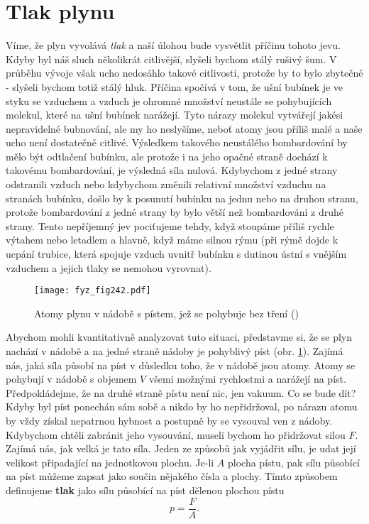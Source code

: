   \section{Tlak plynu}\label{fyz:IchapIXLsecII}
    Víme, že plyn vyvolává \emph{tlak} a naší úlohou bude vysvětlit příčinu tohoto jevu. Kdyby byl
    náš sluch několikrát citlivější, slyšeli bychom stálý rušivý šum. V průběhu vývoje však ucho
    nedosáhlo takové citlivosti, protože by to bylo zbytečné - slyšeli bychom totiž stálý hluk.
    Příčina spočívá v tom, že ušní bubínek je ve styku se vzduchem a vzduch je ohromné množství
    neustále se pohybujících molekul, které na ušní bubínek narážejí. Tyto nárazy molekul vytvářejí
    jakési nepravidelné bubnování, ale my ho neslyšíme, neboť atomy jsou příliš malé a naše ucho
    není dostatečně citlivé. Výsledkem takového neustálého bombardování by mělo být odtlačení
    bubínku, ale protože i na jeho opačné straně dochází k takovému bombardování, je výsledná síla
    nulová. Kdybychom z jedné strany odstranili vzduch nebo kdybychom změnili relativní množství
    vzduchu na stranách bubínku, došlo by k posunutí bubínku na jednu nebo na druhou stranu, protože
    bombardování z jedné strany by bylo větší než bombardování z druhé strany. Tento nepříjemný jev
    pociťujeme tehdy, když stoupáme příliš rychle výtahem nebo letadlem a hlavně, když máme silnou
    rýmu (při rýmě dojde k ucpání trubice, která spojuje vzduch uvnitř bubínku s dutinou ústní s
    vnějším vzduchem a jejich tlaky se nemohou vyrovnat).

    \begin{figure}[ht!] %
      \centering
      \texttt{[image: fyz\_fig242.pdf]}
      \caption{Atomy plynu v nádobě s pístem, jež se pohybuje bez tření (\cite[s.~525]{Feynman01})}
      \label{fyz:fig242}
    \end{figure}

    Abychom mohli kvantitativně analyzovat tuto situaci, představme si, že se plyn nachází v nádobě
    a na jedné straně nádoby je pohyblivý píst (obr. \ref{fyz:fig242}). Zajímá nás, jaká síla působí
    na píst v důsledku toho, že v nádobě jsou atomy. Atomy se pohybují v nádobě s objemem \(V\)
    všemi možnými rychlostmi a narážejí na píst. Předpokládejme, že na druhé straně pístu není nic,
    jen vakuum. Co se bude dít? Kdyby byl píst ponechán sám sobě a nikdo by ho nepřidržoval, po
    nárazu atomu by vždy získal nepatrnou hybnost a postupně by se vysouval ven z nádoby. Kdybychom
    chtěli zabránit jeho vysouvání, museli bychom ho přidržovat silou \(F\). Zajímá nás, jak velká
    je tato síla. Jeden ze způsobů jak vyjádřit sílu, je udat její velikost připadající na
    jednotkovou plochu. Je-li \(A\) plocha pístu, pak sílu působící na píst můžeme zapsat jako
    součin nějakého čísla a plochy. Tímto způsobem definujeme \textbf{tlak} jako sílu působící na
    píst dělenou plochou pístu
    \begin{equation}\label{fyz:eq613}
      p = \frac{F}{A}.
    \end{equation}

